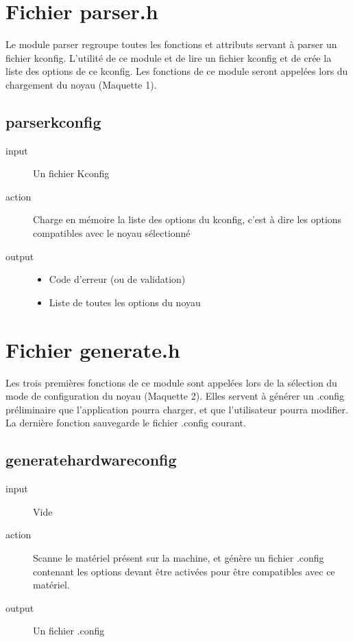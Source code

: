 \documentclass[16pts]{report}
\begin{document}
\chapter{Fichier parser.h}
\label{cha:Fichier parser.h}
Le module parser regroupe toutes les fonctions et attributs servant à parser un
fichier kconfig. L’utilité de ce module et de lire un fichier kconfig et de
crée la liste des options de ce kconfig. Les fonctions de ce module seront
appelées lors du chargement du noyau (Maquette 1).

\section{parser\textunderscore kconfig}
\label{sec:parser kconfig}
\begin{description}
    \item[input] Un fichier Kconfig
    \item[action] Charge en mémoire la liste des options du kconfig, c’est à
        dire les options compatibles avec le noyau sélectionné
    \item[output]
    \begin{itemize}
        \item Code d'erreur (ou de validation)
        \item Liste de toutes les options du noyau
    \end{itemize}
\end{description}


\chapter{Fichier generate.h}
\label{cha:Fichier generate.h}
Les trois premières fonctions de ce module sont appelées lors de la sélection
du mode de configuration du noyau (Maquette 2). Elles servent à générer un
.config préliminaire que l’application pourra charger, et que l’utilisateur
pourra modifier.
La dernière fonction sauvegarde le fichier .config courant.

\section{generate\textunderscore hardware\textunderscore config}
\label{sec:generate hardware config}
\begin{description}
    \item[input] Vide
    \item[action] Scanne le matériel présent sur la machine, et génère un
        fichier .config contenant les options devant être activées pour être
        compatibles avec ce matériel.
    \item[output] Un fichier .config
\end{description}
\end{document}
